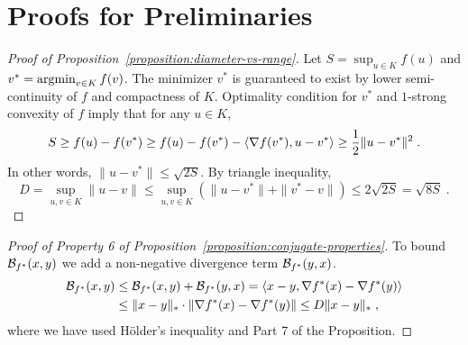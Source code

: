 \section{Proofs for Preliminaries}
\label{section:definitions-proofs}

\begin{proof}[Proof of Proposition~\ref{proposition:diameter-vs-range}]
Let $S = \sup_{u \in K} f(u)$ and $v^* = \operatorname*{argmin}_{v \in K} f(v)$. The minimizer
$v^*$ is guaranteed to exist by lower semi-continuity of $f$ and compactness of
$K$.  Optimality condition for $v^*$ and $1$-strong convexity of $f$ imply that
for any $u \in K$,
$$
S
\ge f(u) - f(v^*)
\ge f(u) - f(v^*) - \langle \nabla f(v^*), u - v^* \rangle
\ge \frac{1}{2}\|u - v^*\|^2 \; .
$$
In other words, $\|u - v^*\| \le \sqrt{2S}$. By triangle inequality,
$$
D = \sup_{u,v \in K} \|u - v\| \le \sup_{u,v \in K} \left( \|u - v^*\| + \|v^ * - v\| \right) \le 2\sqrt{2S} = \sqrt{8S} \; .
$$
\end{proof}

\begin{proof}[Proof of Property 6 of Proposition~\ref{proposition:conjugate-properties}]
To bound $\mathcal{B}_{f^*}(x,y)$ we add a non-negative divergence term
$\mathcal{B}_{f^*}(y,x)$.
\begin{align*}
\mathcal{B}_{f^*}(x, y)
& \le \mathcal{B}_{f^*}(x,y) + \mathcal{B}_{f^*}(y,x)
= \langle x - y, \nabla f^*(x) - \nabla f^*(y) \rangle \\
& \le \|x - y\|_* \cdot \| \nabla f^*(x) - \nabla f^*(y) \|
\le D \|x - y\|_* \; ,
\end{align*}
where we have used H\"older's inequality and Part 7 of the Proposition.
\end{proof}

